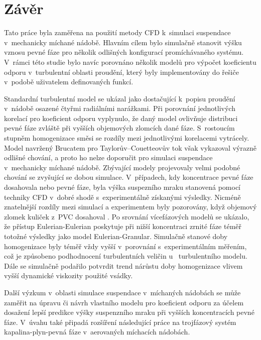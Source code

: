 \chapter{Závěr}
Tato práce byla zaměřena na použití metody CFD k~simulaci suspendace v~mechanicky míchané nádobě. Hlavním cílem bylo simulačně stanovit výšku vznosu pevné fáze pro několik odlišných konfigurací promíchávaného systému. V~rámci této studie bylo navíc porovnáno několik modelů pro výpočet koeficientu odporu v~turbulentní oblasti proudění, který byly implementovány do řešiče \flu{} v~podobě uživatelem definovaných funkcí.

Standardní \keps{} turbulentní model se ukázal jako dostačující k~popisu proudění v~nádobě osazené čtyřmi radiálními narážkami. Při porovnání jednotlivých korelací pro koeficient odporu vyplynulo, že daný model ovlivňuje distribuci pevné fáze zvláště při vyšších objemových zlomcích dané fáze. S~rostoucím stupněm homogenizace směsi se rozdíly mezi jednotlivými korelacemi vytrácely. Model navržený Brucatem pro Tay\-lo\-rův–Couetteovův tok však vykazoval výrazně odlišné chování, a proto ho nelze doporučit pro simulaci suspendace v~mechanicky míchané nádobě. Zbývající modely projevovaly velmi podobné chování se zvyšující se dobou simulace. V~případech, kdy koncentrace pevné fáze dosahovala  nebo  pevné fáze, byla výška suspezního mraku stanovená pomocí techniky CFD v~dobré shodě s~experimentálně získanými výsledky. Nicméně znatelnější rozdíly mezi simulací a experimentem byly pozorovány, když objemový zlomek kuliček z~PVC dosahoval . Po srovnání více\-fá\-zo\-vých modelů se ukázalo, že přístup Eulerian-Eulerian poskytuje při nižší koncentraci zrnité fáze téměř totožné výsledky jako model Eulerian-Granular. Simulačně stanové doby homogenizace byly téměř vždy vyšší v~porovnání s~experimentálním měřením, což je způsobeno podhodnocení turbulentních veličin u~\keps{} turbulentního modelu. Dále se simulačně podařilo potvrdit trend nárůstu doby homogenizace vlivem vyšší dynamické viskozity použité vsádky.

Další výzkum v~oblasti simulace suspendace v~míchaných nádobách se může zaměřit na úpravu či návrh vlastního modelu pro koeficient odporu za účelem dosažení lepší predikce výšky suspenzního mraku při vyšších koncentracích pevné fáze. V~úvahu také připadá rozšíření následující práce na trojfázový systém kapalina-plyn-pevná fáze v~ae\-ro\-va\-ných mí\-cha\-cích ná\-do\-bách.
